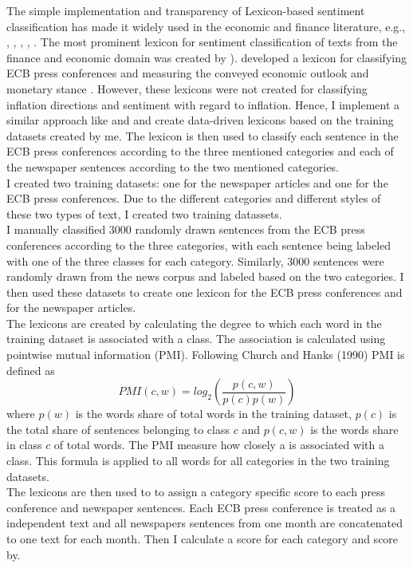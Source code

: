 \documentclass[review]{elsarticle}
\begin{document}
The simple implementation and transparency of Lexicon-based sentiment classification has made it widely used in the economic and finance literature, e.g., \cite{Shapiro2022}, \cite{Loughran2011}, \cite{Barbaglia2022}, \cite{Nyman2021}, \cite{Ardia2019}. The most prominent lexicon for sentiment classification of texts from the finance and economic domain was created by \cite{Loughran2011}). \cite{PicaultRenault2017} developed a lexicon for classifying ECB press conferences and measuring the conveyed economic outlook and monetary stance . However, these lexicons were not created for classifying inflation directions and sentiment with regard to inflation. Hence, I implement a similar approach like \cite{Shapiro2022} and \cite{PicaultRenault2017} and create data-driven lexicons based on the training datasets created by me. The lexicon is then used to classify each sentence in the ECB press conferences according to the three mentioned categories and each of the newspaper sentences according to the two mentioned categories.
\\
I created two training datasets: one for the newspaper articles and one for the ECB press conferences. Due to the different categories and different styles of these two types of text, I created two training datassets.
\\
I manually classified 3000 randomly drawn sentences from the ECB press conferences according to the three categories, with each sentence being labeled with one of the three classes for each category. Similarly, 3000 sentences were randomly drawn from the news corpus and labeled based on the two categories. I then used these datasets to create one lexicon for the ECB press conferences and for the newspaper articles.
\\
The lexicons are created by calculating the degree to which each word in the training dataset is associated with a class. The association is calculated using pointwise mutual information (PMI). Following Church and Hanks (1990) PMI is defined as
\begin{equation}
PMI(c,w) = log_2 (\frac{p(c,w)}{p(c)p(w)})
\end{equation}
where $p(w)$ is the words share of total words in the training dataset, $p(c)$ is the total share of sentences belonging to class $c$ and $p(c,w)$ is the words share in class $c$ of total words. The PMI measure how closely a is associated with a class. This formula is applied to all words for all categories in the two training datasets.  
\\
The lexicons are then used to to assign a category specific score to each press conference and newspaper sentences. Each ECB press conference is treated as a independent text and all newspapers sentences from one month are concatenated to one text for each month. Then I calculate a score for each category and score by.
\end{document}
